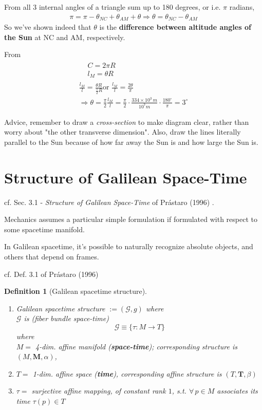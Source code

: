 \documentclass[10pt]{amsart}
\newtheorem{definition}{Definition}
\begin{document}
\begin{multicols*}{2}
From all 3 internal angles of a triangle sum up to 180 degrees, or i.e. $\pi$ radians,
\[
\begin{gathered}
	\pi = \pi - \theta_{NC} + \theta_{AM} + \theta \Longrightarrow \boxed{ \theta = \theta_{NC} - \theta_{AM}} 
\end{gathered}
\]
So we've shown indeed that $\theta$ is the \textbf{difference between altitude angles of the Sun} at NC and AM, respectively.


From 
\[
\begin{gathered}
\begin{aligned}
	& C = 2 \pi R \\
 	& l_M = \theta R 
\end{aligned} \\
\frac{ l_M }{l} = \frac{ \theta R}{  \frac{\pi}{2} R } \text{or } \frac{ l_M}{l} = \frac{ 2 \theta}{ \pi} \\
 \Longrightarrow \theta = \frac{\pi}{2} \frac{ l_M}{l} = \frac{\pi}{2} \cdot \frac{334 \times 10^3 \, m}{ 10^7 m} \cdot \frac{ 180^{\circ} }{ \pi} = 3^{\circ}
\end{gathered}
\]

Advice, remember to draw a \emph{cross-section} to make diagram clear, rather than worry about "the other transverse dimension". Also, draw the lines literally parallel to the Sun because of how far away the Sun is and how large the Sun is.


\section{Structure of Galilean Space-Time}

cf. Sec. 3.1 - \emph{Structure of Galilean Space-Time} of Pr\'{a}staro (1996) \cite{Pras1996}.

Mechanics assumes a particular simple formulation if formulated with respect to some spacetime manifold.

In Galilean spacetime, it's possible to naturally recognize absolute objects, and others that depend on frames.

cf. Def. 3.1 of Pr\'{a}staro (1996) \cite{Pras1996}
\begin{definition}[Galilean spacetime structure]
\begin{enumerate}
	\item Galilean spacetime structure $:= (\mathcal{G}, g)$ where \\
	$\mathcal{G}$ is (fiber bundle space-time)
	\begin{equation}
		\mathcal{G} \equiv \lbrace \tau : M \to T \rbrace
	\end{equation}
	where \\
	$M = $ 4-dim. affine manifold (\textbf{space-time}); corresponding structure is $(M, \mathbf{M}, \alpha)$, \\
\item	$T = $ 1-dim. affine space (\textbf{time}), corresponding affine structure is $(T, \mathbf{T}, \beta)$
\item $\tau = $ surjective affine mapping, of constant rank $1$, s.t. $\forall \, p \in M$ associates its time $\tau(p) \in T$
\end{enumerate}


\end{definition}
\end{multicols*}
\end{document}
